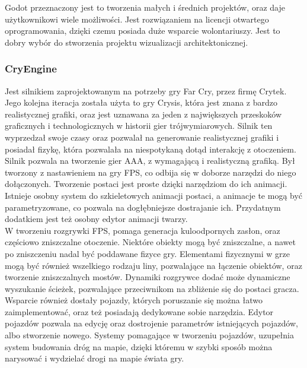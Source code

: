 \documentclass{article} %
\begin{document}
        Godot przeznaczony jest to tworzenia małych i średnich projektów, oraz daje użytkownikowi wiele możliwości. Jest rozwiązaniem na licencji otwartego oprogramowania, dzięki czemu posiada duże wsparcie wolontariuszy. Jest to dobry wybór do stworzenia projektu wizualizacji architektonicznej.
        \\
        
        \subsubsection*{CryEngine}
        Jest silnikiem zaprojektowanym na potrzeby gry Far Cry, przez firmę Crytek. Jego kolejna iteracja została użyta to gry Crysis, która jest znana z bardzo realistycznej grafiki, oraz jest uznawana za jeden z największych przeskoków graficznych i technologicznych w historii gier trójwymiarowych. Silnik ten wyprzedzał swoje czasy oraz pozwalał na generowanie realistycznej grafiki i posiadał fizykę, która pozwalała na niespotykaną dotąd interakcję z otoczeniem. 
        \\
        
        Silnik pozwala na tworzenie gier AAA, z wymagającą i realistyczną grafiką. Był tworzony z nastawieniem na gry FPS, co odbija się w doborze narzędzi do niego dołączonych. Tworzenie postaci jest proste dzięki narzędziom do ich animacji. Istnieje osobny system do szkieletowych animacji postaci, a animacje te mogą być parametryzowane, co pozwala na dogłębniejsze dostrajanie ich. Przydatnym dodatkiem jest też osobny edytor animacji twarzy.
        \\
        
        W tworzeniu rozgrywki FPS, pomaga generacja kuloodpornych zasłon, oraz częściowo zniszczalne otoczenie. Niektóre obiekty mogą być zniszczalne, a nawet po zniszczeniu nadal być poddawane fizyce gry. Elementami fizycznymi w grze mogą być również wszelkiego rodzaju liny, pozwalające na łączenie obiektów, oraz tworzenie zniszczalnych mostów. Dynamiki rozgrywce dodać może dynamiczne wyszukanie ścieżek, pozwalające przeciwnikom na zbliżenie się do postaci gracza.
        \\
        
        Wsparcie również dostały pojazdy, których poruszanie się można łatwo zaimplementować, oraz też posiadają dedykowane sobie narzędzia. Edytor pojazdów pozwala na edycję oraz dostrojenie parametrów istniejących pojazdów, albo stworzenie nowego. Systemy pomagające w tworzeniu pojazdów, uzupełnia system budowania dróg na mapie, dzięki któremu w szybki sposób można narysować i wydzielać drogi na mapie świata gry.
        \\
        
\end{document}
